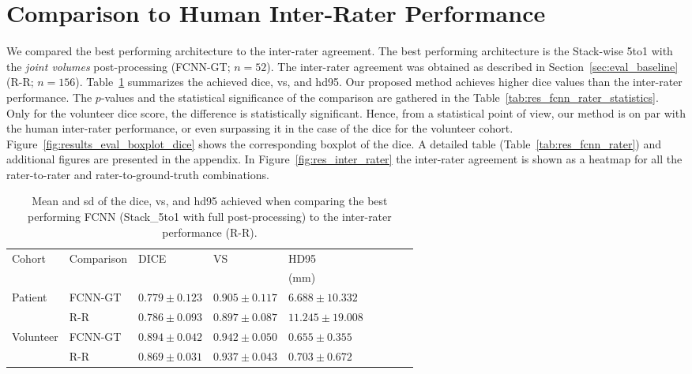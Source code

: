 \section{Comparison to Human Inter-Rater Performance} \label{sec:exp_evaluation} %
We compared the best performing architecture to the inter-rater agreement. The best performing architecture is the Stack-wise 5to1 with the \textit{joint volumes} post-processing (FCNN-GT; $n = 52$). The inter-rater agreement was obtained as described in Section~\ref{sec:eval_baseline} (R-R; $n = 156$).
Table~\ref{tab:res_fcnn_rater_small} summarizes the achieved \acrlong{dice}, \acrlong{vs}, and \acrlong{hd95}. Our proposed method achieves higher \gls{dice} values than the inter-rater performance. The $p$-values and the statistical significance of the comparison are gathered in the Table~\ref{tab:res_fcnn_rater_statistics}. Only for the volunteer \gls{dice} score, the difference is statistically significant. Hence, from a statistical point of view, our method is on par with the human inter-rater performance, or even surpassing it in the case of the \acrlong{dice} for the volunteer cohort.
Figure~\ref{fig:results_eval_boxplot_dice} shows the corresponding boxplot of the \acrlong{dice}. A detailed table (Table~\ref{tab:res_fcnn_rater}) and additional figures  are presented in the appendix.
In Figure~\ref{fig:res_inter_rater} the inter-rater agreement is shown as a heatmap for all the rater-to-rater and rater-to-ground-truth combinations.

\begin{table}[htbp]
   \centering
   \caption[Results for Comparison to Inter-Rater Performance]{Mean and \gls{sd} of the \acrlong{dice}, \acrlong{vs}, and \acrlong{hd95} achieved when comparing the best performing FCNN (Stack\_5to1 with full post-processing) to the inter-rater performance (R-R).}
   \begin{tabular}{l*{8}{l}}
      \toprule
      Cohort	& Comparison & DICE              & VS				& HD95\\
      			&			&					&					& (mm)\\
      \midrule
        Patient     & FCNN-GT & $0.779 \pm 0.123$ & $\mathbf{0.905 \pm 0.117}$ &                     $\mathbf{6.688  \pm 10.332}$ \\
                    & R-R     & $\mathbf{0.786 \pm 0.093}$ & $0.897 \pm 0.087$ &                     $11.245 \pm 19.008$ \\
        \midrule
        Volunteer   & FCNN-GT & $\mathbf{0.894 \pm 0.042}$ & $\mathbf{0.942 \pm 0.050}$ &                     $\mathbf{0.655  \pm 0.355} $ \\
                    & R-R     & $0.869 \pm 0.031$ & $0.937 \pm 0.043$ &                     $0.703  \pm 0.672 $ \\
      \bottomrule
   \end{tabular}
   \label{tab:res_fcnn_rater_small}
\end{table}



